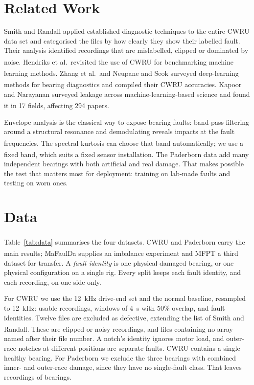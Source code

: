 \documentclass[conference,letterpaper]{IEEEtran}
\newcommand{\scite}[1]{\textsuperscript{\cite{#1}}}
\begin{document}
\section{Related Work}

Smith and Randall applied established diagnostic techniques to the entire CWRU data set and categorised the
files by how clearly they show their labelled fault. Their analysis identified recordings that are mislabelled,
clipped or dominated by noise\scite{smith2015}. Hendriks et al.\ revisited the use of CWRU for benchmarking machine
learning methods\scite{hendriks2022}. Zhang et al.\ and Neupane and Seok surveyed deep-learning methods for bearing
diagnostics and compiled their CWRU accuracies\scite{zhang2020,neupane2020}. Kapoor and Narayanan surveyed leakage
across machine-learning-based science and found it in 17 fields, affecting 294 papers\scite{kapoor2023}.

Envelope analysis is the classical way to expose bearing faults: band-pass filtering around a structural
resonance and demodulating reveals impacts at the fault frequencies\scite{randall2011}. The spectral kurtosis can
choose that band automatically\scite{antoni2006}; we use a fixed band, which suits a fixed sensor installation.
The Paderborn data\scite{lessmeier2016} add many independent bearings with both artificial and real damage. That
makes possible the test that matters most for deployment: training on lab-made faults and testing on worn ones.

\section{Data}

Table~\ref{tab:data} summarises the four datasets. CWRU\scite{cwru} and Paderborn\scite{lessmeier2016} carry the
main results; MaFaulDa\scite{mafaulda} supplies an imbalance experiment and MFPT\scite{mfpt} a third dataset for
transfer. A \emph{fault identity} is one physical damaged bearing, or one physical configuration on a single rig.
Every split keeps each fault identity, and each recording, on one side only.



For CWRU we use the 12~kHz drive-end set and the normal baseline, resampled to 12~kHz:
 usable recordings,  windows of 4~s with 50\% overlap, and  fault
identities. Twelve files are excluded as defective, extending the list of Smith and Randall\scite{smith2015}.
These are clipped or noisy recordings, and files containing no array named after their file number. A notch's
identity ignores motor load, and outer-race notches at different positions are separate faults. CWRU contains a
single healthy bearing. For Paderborn we exclude the three bearings with combined inner- and outer-race damage,
since they have no single-fault class. That leaves  recordings of  bearings.
\end{document}
